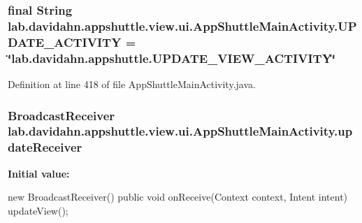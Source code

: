 \hypertarget{classlab_1_1davidahn_1_1appshuttle_1_1view_1_1ui_1_1_app_shuttle_main_activity_ab8fff9962a15a493497a543df7633950}{
\subsubsection[{\-U\-P\-D\-A\-T\-E\-\_\-\-A\-C\-T\-I\-V\-I\-T\-Y}]{\setlength{\rightskip}{0pt plus 5cm}final \-String {\bf lab.\-davidahn.\-appshuttle.\-view.\-ui.\-App\-Shuttle\-Main\-Activity.\-U\-P\-D\-A\-T\-E\-\_\-\-A\-C\-T\-I\-V\-I\-T\-Y} = \char`\"{}lab.\-davidahn.\-appshuttle.\-U\-P\-D\-A\-T\-E\-\_\-\-V\-I\-E\-W\-\_\-\-A\-C\-T\-I\-V\-I\-T\-Y\char`\"{}}}\label{classlab_1_1davidahn_1_1appshuttle_1_1view_1_1ui_1_1_app_shuttle_main_activity_ab8fff9962a15a493497a543df7633950}


\-Definition at line 418 of file \-App\-Shuttle\-Main\-Activity.\-java.

\hypertarget{classlab_1_1davidahn_1_1appshuttle_1_1view_1_1ui_1_1_app_shuttle_main_activity_a704f93e06003d70c2f702dd119199823}{
\subsubsection[{update\-Receiver}]{\setlength{\rightskip}{0pt plus 5cm}\-Broadcast\-Receiver {\bf lab.\-davidahn.\-appshuttle.\-view.\-ui.\-App\-Shuttle\-Main\-Activity.\-update\-Receiver}}}\label{classlab_1_1davidahn_1_1appshuttle_1_1view_1_1ui_1_1_app_shuttle_main_activity_a704f93e06003d70c2f702dd119199823}
{\bfseries \-Initial value\-:}
\begin{DoxyCode}
 new BroadcastReceiver() {
                public void onReceive(Context context, Intent intent) {
                        updateView();
                }
        }
\end{DoxyCode}


